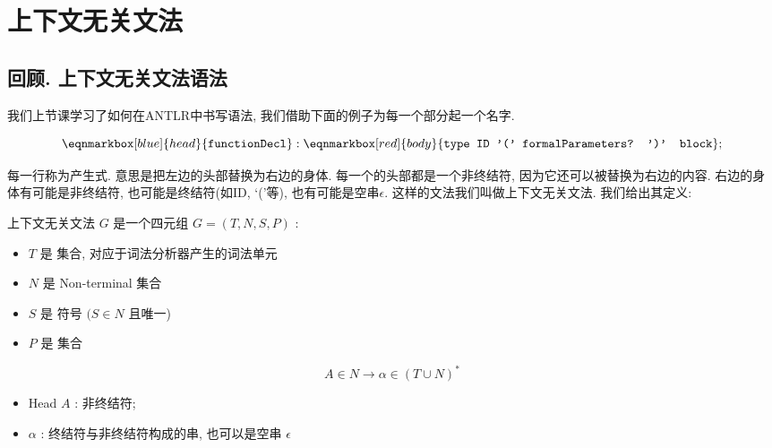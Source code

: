 \documentclass{ctexart}
\begin{document}
\section{上下文无关文法}

\subsection{回顾. 上下文无关文法语法}

我们上节课学习了如何在ANTLR中书写语法, 我们借助下面的例子为每一个部分起一个名字. 

\begin{example}
    \begin{equation*}
        \eqnmarkbox[blue]{head}{\texttt{functionDecl}} : \eqnmarkbox[red]{body}{\texttt{type ID '(' formalParameters? ')' block}};  
\end{equation*}


每一行称为产生式. 意思是把左边的头部替换为右边的身体. 每一个的头部都是一个非终结符, 因为它还可以被替换为右边的内容. 右边的身体有可能是非终结符, 也可能是终结符(如ID, `('等), 也有可能是空串$\epsilon$. 这样的文法我们叫做上下文无关文法. 我们给出其定义: 
\end{example}


\begin{definition}
    上下文无关文法 $G$ 是一个四元组 $G=(T, N, S, P)$ :
    \begin{itemize}
        \item  $T$ 是 集合, 对应于词法分析器产生的词法单元
        \item $N$ 是 {Non-terminal} 集合
        \item $S$ 是 符号 $(S \in N$ 且唯一)
        \item $P$ 是 集合
    \end{itemize}
    $$
A \in N \longrightarrow \alpha \in(T \cup N)^*
$$
\begin{itemize}
    \item {} {Head} $A$ : 非终结符; 
    \item {}  $\alpha$ : 终结符与非终结符构成的串, 也可以是空串 $\epsilon$
\end{itemize}
\end{definition}
\end{document}
